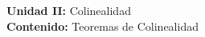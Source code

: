 {\Large
    \textbf{Unidad II:} Colinealidad\vspace{2mm}\\
    \textbf{Contenido:} Teoremas de Colinealidad
}
